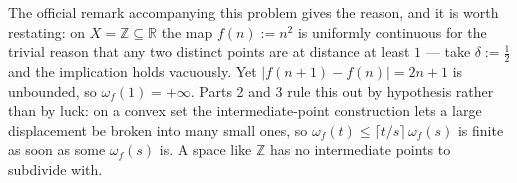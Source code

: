 \begin{exercisesolution}
\begin{remark}
The official remark accompanying this problem gives the reason, and it is worth restating: on
$X = \mathbb{Z} \subseteq \mathbb{R}$ the map $f(n) := n^2$ is uniformly continuous for the
trivial reason that any two distinct points are at distance at least $1$ --- take
$\delta := \tfrac12$ and the implication holds vacuously. Yet
$|f(n+1)-f(n)| = 2n+1$ is unbounded, so $\omega_f(1) = +\infty$. Parts 2 and 3 rule this out by
hypothesis rather than by luck: on a convex set the intermediate-point construction lets a large
displacement be broken into many small ones, so $\omega_f(t) \leq \lceil t/s\rceil\,\omega_f(s)$
is finite as soon as some $\omega_f(s)$ is. A space like $\mathbb{Z}$ has no intermediate points
to subdivide with.
\end{remark}
\end{exercisesolution}

